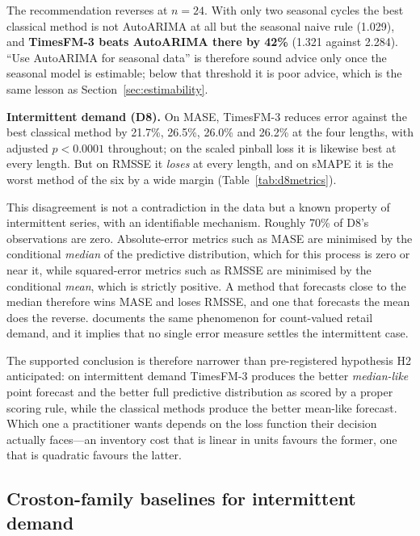 \documentclass[article]{ajs}
\providecommand{\sectionref}[1]{Section~\ref{#1}}
\providecommand{\tableref}[1]{Table~\ref{#1}}
\begin{document}
The recommendation reverses at $n = 24$. With only two seasonal
cycles the best classical method is not AutoARIMA at all but the seasonal naive rule (1.029),
and \textbf{TimesFM-3 beats AutoARIMA there by 42\%} (1.321 against 2.284). ``Use AutoARIMA for
seasonal data'' is therefore sound advice only once the seasonal model is estimable; below that
threshold it is poor advice, which is the same lesson as \sectionref{sec:estimability}.

\textbf{Intermittent demand (D8).}
On MASE, TimesFM-3 reduces error against the best classical method by 21.7\%, 26.5\%, 26.0\% and
26.2\% at the four lengths, with adjusted $p < 0.0001$ throughout; on the scaled pinball loss it
is likewise best at every length. But on RMSSE it \emph{loses} at every length, and on sMAPE it
is the worst method of the six by a wide margin (\tableref{tab:d8metrics}).



This disagreement is not a contradiction in the data but a known property of intermittent
series, with an identifiable mechanism. Roughly 70\% of D8's observations are zero. Absolute-error metrics such as MASE
are minimised by the conditional \emph{median} of the predictive distribution, which for this
process is zero or near it, while squared-error metrics such as RMSSE are minimised by the
conditional \emph{mean}, which is strictly positive. A method that forecasts close to the median
therefore wins MASE and loses RMSSE, and one that forecasts the mean does the reverse. \citet{kolassa2016count}
documents the same phenomenon for count-valued retail demand, and it implies that no single error
measure settles the intermittent case.

The supported conclusion is therefore narrower than pre-registered hypothesis H2 anticipated: on
intermittent demand TimesFM-3 produces the better \emph{median-like} point forecast and the
better full predictive distribution as scored by a proper scoring rule, while the classical
methods produce the better mean-like forecast. Which one a practitioner wants depends on the
loss function their decision actually faces---an inventory cost that is linear in units favours
the former, one that is quadratic favours the latter.

\subsection{Croston-family baselines for intermittent demand}
\label{sec:croston}
\end{document}
